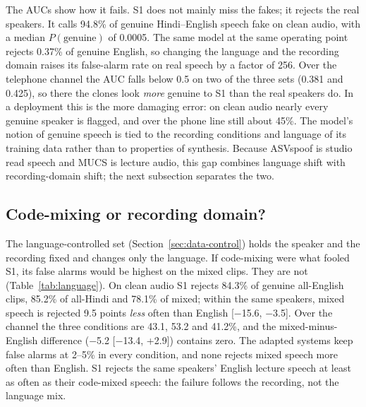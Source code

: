 The AUCs show how it fails. S1 does not mainly miss the fakes; it rejects the real
speakers. It calls 94.8\% of genuine Hindi--English speech fake on clean audio, with
a median $P(\text{genuine})$ of 0.0005. The same model at the same operating point
rejects 0.37\% of genuine English, so changing the language and the recording domain
raises its false-alarm rate on real speech by a factor of 256.
Over the telephone channel the AUC falls
below 0.5 on two of the three sets (0.381 and 0.425), so there the clones look \emph{more}
genuine to S1 than the real speakers do.
In a deployment this is the more damaging error: on clean audio nearly every genuine
speaker is flagged, and over the phone line still about 45\%. The model's notion of genuine speech is tied to the recording conditions
and language of its training data rather than to properties of synthesis. Because
ASVspoof is studio read speech and MUCS is lecture audio, this gap combines language
shift with recording-domain shift; the next subsection separates the two.

\subsection{Code-mixing or recording domain?}
\label{sec:res-language}

The language-controlled set (Section~\ref{sec:data-control}) holds the speaker and the
recording fixed and changes only the language. If code-mixing were what fooled S1, its
false alarms would be highest on the mixed clips. They are not
(Table~\ref{tab:language}). On clean audio S1 rejects 84.3\% of genuine all-English
clips, 85.2\% of all-Hindi and 78.1\% of mixed; within the same speakers, mixed speech
is rejected 9.5 points \emph{less} often than English [$-$15.6, $-$3.5]. Over the
channel the three conditions are 43.1, 53.2 and 41.2\%, and the mixed-minus-English
difference ($-$5.2 [$-$13.4, +2.9]) contains zero. The adapted systems keep false
alarms at 2--5\% in every condition, and none rejects mixed speech more often than
English. S1 rejects the same speakers' English lecture speech at least as often as their
code-mixed speech: the failure follows the recording, not the language mix.

